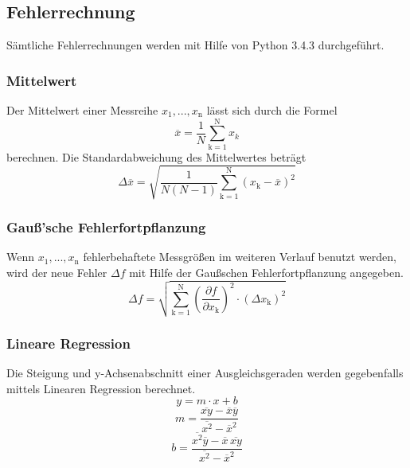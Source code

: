 \subsection{Fehlerrechnung}
Sämtliche Fehlerrechnungen werden mit Hilfe von Python 3.4.3 durchgeführt.
\subsubsection{Mittelwert}
Der Mittelwert einer Messreihe $x_1, ... ,x_\text{n}$ lässt sich durch die Formel
\begin{equation}
	\overline{x} = \frac{1}{N} \sum_{\text{k}=1}^\text{N} x_k
	\label{eqn:ave}
\end{equation}
berechnen. Die Standardabweichung des Mittelwertes beträgt
\begin{equation}
	\Delta \overline{x} = \sqrt{ \frac{1}{N(N-1)} \sum_{\text{k}=1}^\text{N} (x_\text{k} - \overline{x})^2}
	\label{eqn:std}
\end{equation}

\subsubsection{Gauß'sche Fehlerfortpflanzung}
Wenn $x_1, ..., x_\text{n}$ fehlerbehaftete Messgrößen im weiteren Verlauf benutzt werden, wird der neue Fehler $\Delta f$ mit Hilfe der Gaußschen Fehlerfortpflanzung angegeben.
\begin{equation}
	\Delta f = \sqrt{\sum_{\text{k}=1}^\text{N} \left( \frac{ \partial f}{\partial x_\text{k}} \right) ^2 \cdot (\Delta x_\text{k})^2}
	\label{eqn:var}
\end{equation}

\subsubsection{Lineare Regression}
Die Steigung und y-Achsenabschnitt einer Ausgleichsgeraden werden gegebenfalls mittels Linearen Regression berechnet.
\begin{equation}
	y = m \cdot x + b
	\label{eqn:reg}
\end{equation}
\begin{equation}
	m = \frac{ \overline{xy} - \overline{x} \overline{y} } {\overline{x^2} - \overline{x}^2}
	\label{eqn:reg_m}
\end{equation}
\begin{equation}
	b = \frac{ \overline{x^2}\overline{y} - \overline{x} \, \overline{xy}} { \overline{x^2} - \overline{x}^2}
	\label{eqn:reg_b}
\end{equation}
